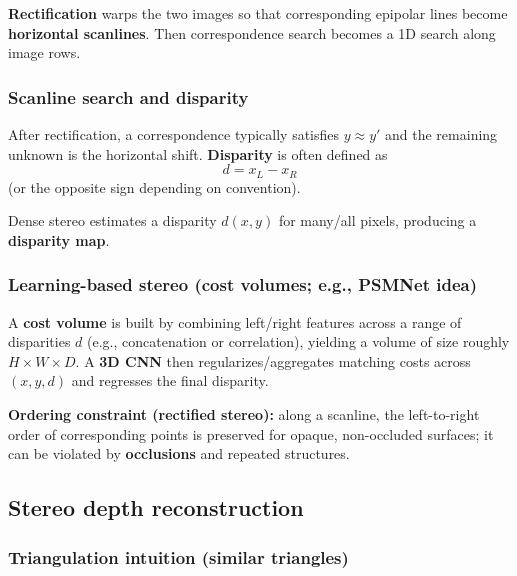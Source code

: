 \documentclass[11pt,a4paper]{article}
\begin{document}
\begin{defbox}
\textbf{Rectification} warps the two images so that corresponding epipolar lines become \textbf{horizontal scanlines}.
Then correspondence search becomes a 1D search along image rows.
\end{defbox}

\subsubsection{Scanline search and disparity}

\begin{defbox}
After rectification, a correspondence typically satisfies $y \approx y'$ and the remaining unknown is the horizontal shift.
\textbf{Disparity} is often defined as
\[
d = x_L - x_R
\]
(or the opposite sign depending on convention).
\end{defbox}

\begin{notebox}
Dense stereo estimates a disparity $d(x,y)$ for many/all pixels, producing a \textbf{disparity map}.
\end{notebox}

\subsubsection{Learning-based stereo (cost volumes; e.g., PSMNet idea)}
\begin{notebox}
A \textbf{cost volume} is built by combining left/right features across a range of disparities $d$ (e.g., concatenation or correlation),
yielding a volume of size roughly $H\times W\times D$.
A \textbf{3D CNN} then regularizes/aggregates matching costs across $(x,y,d)$ and regresses the final disparity.
\end{notebox}

\begin{notebox}
\textbf{Ordering constraint (rectified stereo):} along a scanline, the left-to-right order of corresponding points is preserved for opaque, non-occluded surfaces; it can be violated by \textbf{occlusions} and repeated structures.
\end{notebox}
\subsection{Stereo depth reconstruction}

\subsubsection{Triangulation intuition (similar triangles)}
\end{document}
